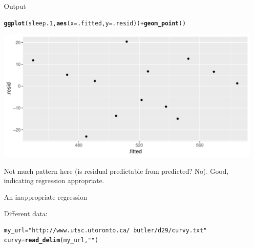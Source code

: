 \documentclass[unknownkeysallowed]{beamer}\usepackage[]{graphicx}\usepackage[]{color}
\makeatletter
\def\maxwidth{ %
  \ifdim\Gin@nat@width>\linewidth
    \linewidth
  \else
    \Gin@nat@width
  \fi
}
\newcommand{\hlstr}[1]{\textcolor[rgb]{0.192,0.494,0.8}{#1}}%
\newcommand{\hlopt}[1]{\textcolor[rgb]{0,0,0}{#1}}%
\newcommand{\hlstd}[1]{\textcolor[rgb]{0.345,0.345,0.345}{#1}}%
\newcommand{\hlkwb}[1]{\textcolor[rgb]{0.69,0.353,0.396}{#1}}%
\newcommand{\hlkwc}[1]{\textcolor[rgb]{0.333,0.667,0.333}{#1}}%
\newcommand{\hlkwd}[1]{\textcolor[rgb]{0.737,0.353,0.396}{\textbf{#1}}}%
\newenvironment{kframe}{%
 \def\at@end@of@kframe{}%
 \ifinner\ifhmode%
  \def\at@end@of@kframe{\end{minipage}}%
  \begin{minipage}{\columnwidth}%
 \fi\fi%
 \def\FrameCommand##1{\hskip\@totalleftmargin \hskip-\fboxsep
 \colorbox{shadecolor}{##1}\hskip-\fboxsep
     \hskip-\linewidth \hskip-\@totalleftmargin \hskip\columnwidth}%
 \MakeFramed {\advance\hsize-\width
   \@totalleftmargin\z@ \linewidth\hsize
   \@setminipage}}%
 {\par\unskip\endMakeFramed%
 \at@end@of@kframe}
\newenvironment{knitrout}{}{} %
\makeatother
\begin{document}
\begin{frame}[fragile]{Output}

 
\begin{knitrout}
\color{fgcolor}\begin{kframe}
\begin{alltt}
\hlkwd{ggplot}\hlstd{(sleep.1,}\hlkwd{aes}\hlstd{(}\hlkwc{x}\hlstd{=.fitted,}\hlkwc{y}\hlstd{=.resid))}\hlopt{+}\hlkwd{geom_point}\hlstd{()}
\end{alltt}
\end{kframe}
\includegraphics[width=\maxwidth]{figure/akjhkadjfhjahnkkk-1} 

\end{knitrout}
  

Not much pattern here (is residual predictable from predicted? No). Good, indicating regression appropriate.
  
\end{frame}


\begin{frame}[fragile]{An inappropriate regression}

Different data:  
  
 
\begin{knitrout}
\color{fgcolor}\begin{kframe}
\begin{alltt}
\hlstd{my_url}\hlkwb{=}\hlstr{"http://www.utsc.utoronto.ca/~butler/d29/curvy.txt"}
\hlstd{curvy}\hlkwb{=}\hlkwd{read_delim}\hlstd{(my_url,}\hlstr{" "}\hlstd{)}
\end{alltt}


{\ttfamily\noindent\itshape\color{messagecolor}{\#\# Parsed with column specification:\\\#\# cols(\\\#\#\ \  xx = col\_integer(),\\\#\#\ \  yy = col\_integer()\\\#\# )}}\end{kframe}
\end{knitrout}
  



\end{frame}
\end{document}
